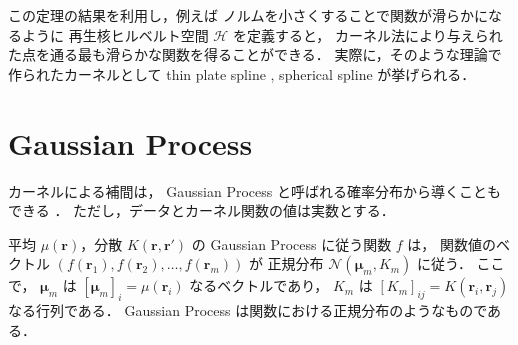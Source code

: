 この定理の結果を利用し，例えば
ノルムを小さくすることで関数が滑らかになるように
再生核ヒルベルト空間 $\mathcal{H}$ を定義すると，
カーネル法により与えられた点を通る最も滑らかな関数を得ることができる．
実際に，そのような理論で作られたカーネルとして
thin plate spline \cite{Ghosh2010},
spherical spline \cite{Wahba1981}
が挙げられる．

\section{Gaussian Process}\label{sec:regularization_kernel_gaussian-process}

カーネルによる補間は，
Gaussian Process と呼ばれる確率分布から導くこともできる
\cite{Brochu2010}．
ただし，データとカーネル関数の値は実数とする．

平均 $\mu(\bm{r})$，分散 $K(\bm{r}, \bm{r}')$ の Gaussian Process に従う関数 $f$ は，
関数値のベクトル $(f(\bm{r}_1), f(\bm{r}_2), \ldots, f(\bm{r}_m))$ が
正規分布 $\mathcal{N}(\bm{\mu}_m, K_m)$ に従う．
ここで，
$\bm{\mu}_m$ は $[\bm{\mu}_m]_i = \mu(\bm{r}_i)$ なるベクトルであり，
$K_m$ は $[K_m]_{ij} = K(\bm{r}_i, \bm{r}_j)$ なる行列である．
Gaussian Process は関数における正規分布のようなものである．

